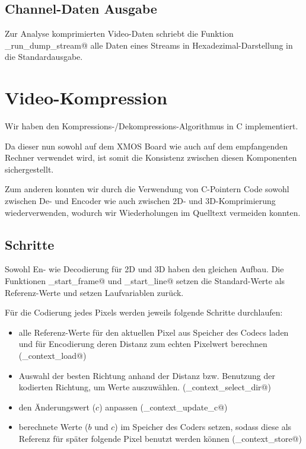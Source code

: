 \subsection{Channel-Daten Ausgabe}
Zur Analyse komprimierten Video-Daten schriebt die Funktion 
\lstinline@tst_run_dump_stream@ alle Daten eines Streams in
Hexadezimal-Darstellung in die Standardausgabe.



\section{Video-Kompression}

Wir haben den Kompressions-/Dekompressions-Algorithmus in C implementiert.

Da dieser nun sowohl auf dem XMOS Board wie auch auf dem empfangenden Rechner 
verwendet wird, ist somit die Konsistenz zwischen diesen Komponenten sichergestellt.

Zum anderen konnten wir durch die Verwendung von C-Pointern Code sowohl zwischen 
De- und Encoder wie auch zwischen 2D- und 3D-Komprimierung wiederverwenden,
wodurch wir Wiederholungen im Quelltext vermeiden konnten.

\subsection{Schritte}
Sowohl En- wie Decodierung für 2D und 3D haben den gleichen Aufbau.
Die Funktionen \lstinline@cmpr_start_frame@ und \lstinline@cmpr_start_line@
setzen die Standard-Werte als Referenz-Werte und setzen Laufvariablen zurück.

Für die Codierung jedes Pixels werden jeweils folgende Schritte durchlaufen:
\begin{itemize}
\item alle Referenz-Werte für den aktuellen Pixel aus Speicher des Codecs laden 
      und für Encodierung deren Distanz zum echten Pixelwert berechnen
	(\lstinline@cmpr_context_load@)
\item Auswahl der besten Richtung anhand der Distanz bzw. Benutzung
      der kodierten Richtung, um Werte auszuwählen.
	(\lstinline@cmpr_context_select_dir@)
\item den Änderungswert ($c$) anpassen
	(\lstinline@cmpr_context_update_c@)
\item berechnete Werte ($b$ und $c$) im Speicher des Coders setzen, sodass diese 
      als Referenz für später folgende Pixel benutzt werden können
	(\lstinline@cmpr_context_store@)
\end{itemize}

